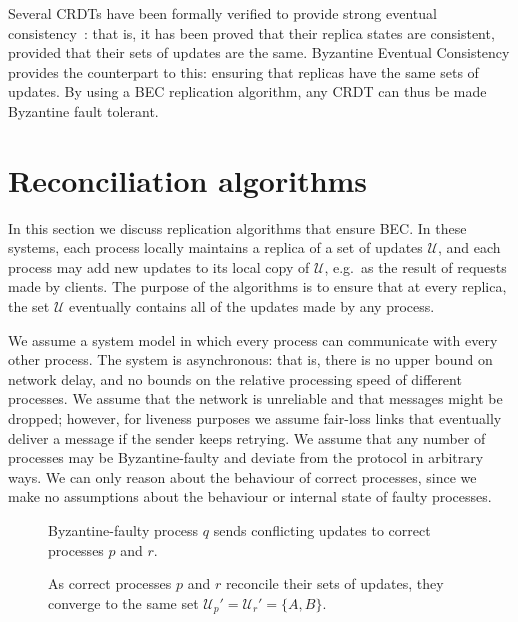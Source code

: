 \documentclass[a4paper,anonymous,USenglish]{lipics-v2019}
\begin{document}
Several CRDTs have been formally verified to provide strong eventual consistency~\cite{Gomes:2017gy,Zeller:2014fl}: that is, it has been proved that their replica states are consistent, provided that their sets of updates are the same.
Byzantine Eventual Consistency provides the counterpart to this: ensuring that replicas have the same sets of updates.
By using a BEC replication algorithm, any CRDT can thus be made Byzantine fault tolerant.

\section{Reconciliation algorithms}\label{sec:algorithm}

In this section we discuss replication algorithms that ensure BEC.
In these systems, each process locally maintains a replica of a set of updates $\mathcal{U}$, and each process may add new updates to its local copy of $\mathcal{U}$, e.g.\ as the result of requests made by clients.
The purpose of the algorithms is to ensure that at every replica, the set $\mathcal{U}$ eventually contains all of the updates made by any process.

We assume a system model in which every process can communicate with every other process.
The system is asynchronous: that is, there is no upper bound on network delay, and no bounds on the relative processing speed of different processes.
We assume that the network is unreliable and that messages might be dropped; however, for liveness purposes we assume fair-loss links that eventually deliver a message if the sender keeps retrying.
We assume that any number of processes may be Byzantine-faulty and deviate from the protocol in arbitrary ways.
We can only reason about the behaviour of correct processes, since we make no assumptions about the behaviour or internal state of faulty processes.

\begin{figure}
    \centering
    
    \caption{Byzantine-faulty process $q$ sends conflicting updates to correct processes $p$ and $r$.}
    \label{fig:trivial1}
\end{figure}

\begin{figure}
    \centering
    
    \caption{As correct processes $p$ and $r$ reconcile their sets of updates, they converge to the same set $\mathcal{U}_p' = \mathcal{U}_r' = \{A,B\}$.}
    \label{fig:trivial2}
\end{figure}
\end{document}
